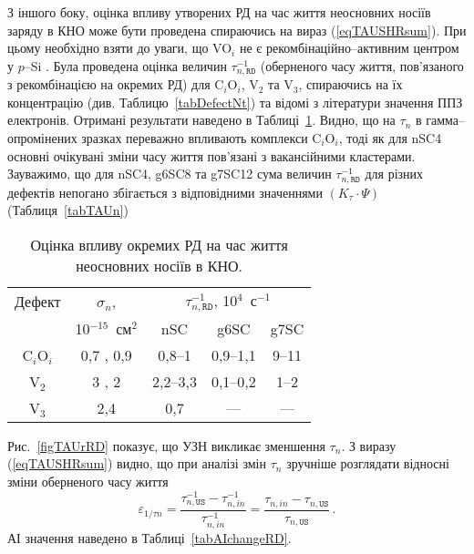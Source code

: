 З іншого боку,
оцінка впливу утворених РД на час життя неосновних носіїв заряду в КНО може бути проведена спираючись
на вираз (\ref{eqTAUSHRsum}).
При цьому необхідно взяти до уваги,
що VO$_i$ не є рекомбінаційно--активним центром у $p$--Si \cite{gamma:Kolkov,IrrCzpSi:Benton,IrrCzpSi:Coffa,IrrCzpSi:Ganagona,IrrCzpSi:Vines}.
Була проведена оцінка величин $\tau_{n,\mathtt{RD}}^{-1}$ (оберненого часу життя, пов'язаного з рекомбінацією на окремих РД)
для C$_i$O$_i$, V$_2$ та  V$_3$, спираючись на їх концентрацію (див. Таблицю~\ref{tabDefectNt}) та відомі з літератури значення ППЗ електронів.
Отримані результати наведено в Таблиці~\ref{tabDefectTAU}.
Видно, що на $\tau_n$ в гамма--опромінених зразках переважно впливають комплекси C$_i$O$_i$, тоді як для nSC4 основні очікувані
зміни часу життя пов'язані з вакансійними кластерами.
Зауважимо, що для nSC4, g6SC8 та g7SC12 сума величин $\tau_{n,\mathtt{RD}}^{-1}$ для різних дефектів
непогано збігається з відповідними значеннями $(K_\tau\cdot\Psi)$ (Таблиця~\ref{tabTAUn})




\begin{table}[b]
\caption{\label{tabDefectTAU}Оцінка впливу окремих РД на час життя неосновних носіїв в КНО.
}
\center
\begin{tabular}{|c|c|c|c|c|}
\hline
Дефект&$\sigma_n$,&\multicolumn{3}{c|}{$\tau_{n,\mathtt{RD}}^{-1}$, 10$^4$~с$^{-1}$}\\ \cline{3-5}
&10$^{-15}$~см$^2$&nSC&g6SC&g7SC\\
\hline
C$_i$O$_i$&0,7 \cite{gamma:Stahl}, 0,9 \cite{gamma:Kolkr}&0,8--1&0,9--1,1&9--11\\ \hline
V$_2$&3 \cite{gamma:Stahl}, 2 \cite{A:Brothe}&2,2--3,3&0,1--0,2&1--2\\ \hline
V$_3$&2,4 \cite{V3:Markevich}&0,7&---&---\\ \hline
\end{tabular}
\end{table}

Рис.~\ref{figTAUrRD} показує, що УЗН викликає зменшення $\tau_n$.
З виразу (\ref{eqTAUSHRsum}) видно, що при аналізі змін $\tau_n$
зручніше розглядати відносні зміни оберненого часу життя
\begin{equation*}
  \varepsilon_{1/\tau n}=\frac{\tau_{n,\mathtt{US}}^{-1}-\tau_{n,in}^{-1}}{\tau_{n,in}^{-1}}=\frac{\tau_{n,in}-\tau_{n,\mathtt{US}}}{\tau_{n,\mathtt{US}}}\,.
\end{equation*}
АІ значення наведено в Таблиці~\ref{tabAIchangeRD}.

